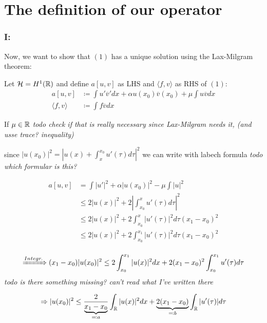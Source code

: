 \section{The definition of our operator}

\subsubsection{I:} Now, we want to show that $(1)$ has a unique solution using the Lax-Milgram theorem:

Let $\mathcal{H} = H^{1}(\mathbb{R})$ and define $a[u, v]$ as LHS and $\langle f , v \rangle$ as RHS of $(1)$:
\begin{align*}
	a[u, v] 			  & \coloneqq \int u' \overline{v}' dx + \alpha u(x_{0}) \overline{v}(x_{0}) + \mu \int u \overline{v} dx \\
	\langle f , v \rangle & \coloneqq \int f \overline{v} dx 
\end{align*}

If $\mu \in \mathbb{R}$ \textit{todo check if that is really necessary since Lax-Milgram needs it, (and usse trace? inequality)} %

since $|u(x_{0})|^{2} = |u(x) + \int_{x}^{x_{0}} u'(\tau) d\tau|^{2}$ we can write with labech formula \textit{todo which formular is this?} %

\begin{align*}
	a[u, v]  & = \int |u'|^{2} + \alpha | u(x_{0})|^{2} - \mu \int | u |^{2} \\
			 & \leq 2 | u(x) |^{2} + 2 | \int_{x_{0}}^{x} u'(\tau) d \tau |^{2} \\
			 & \leq 2 | u(x) |^{2} + 2 \int_{x_{0}}^{x} | u'(\tau) |^{2} d\tau (x_{1} - x_{0})^{2} \\
			 & \leq 2 | u(x) |^{2} + 2 \int_{x_{0}}^{x_{1}} | u'(\tau) |^{2} d\tau (x_{1} - x_{0})^{2} \\
\end{align*}

	\[ \xRightarrow[]{Integr.} (x_{1} - x_{0}) |u(x_{0})|^{2} \leq 2 \int_{x_{0}}^{x_{1}} | u(x)|^{2} dx + 2 (x_{1} - x_{0})^{2} \int_{x_{0}}^{x_{1}} u'(\tau) d\tau \] \textit{todo is there something missing? can't read what I've written there} %

	\[ \Rightarrow | u(x_{0})|^{2} \leq \frac{2}{\underbrace{x_{1} - x_{0}}_{\eqqcolon a}} \int_{\mathbb{R}} | u(x) |^{2} dx + \underbrace{2 (x_{1} - x_{0})}_{\eqqcolon b} \int_{\mathbb{R}} |u'(\tau)| d\tau \]

